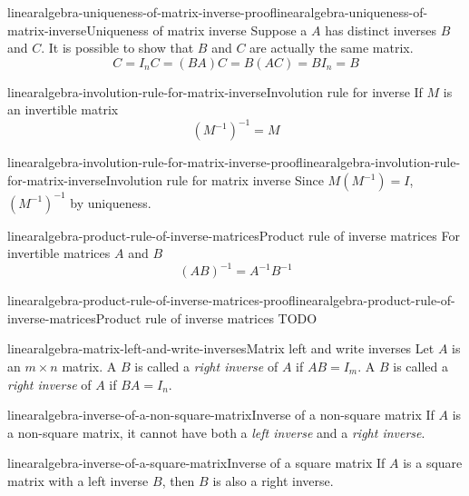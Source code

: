 \documentclass[preview]{standalone}
\begin{document}
\begin{snippetproof}{linearalgebra-uniqueness-of-matrix-inverse-proof}{linearalgebra-uniqueness-of-matrix-inverse}{Uniqueness of matrix inverse}
    Suppose a \matrix \(A\) has distinct inverses \(B\)
    and \(C\).
    It is possible to show that \(B\) and \(C\) are actually
    the same matrix.
    \[
        C=I_n C = (BA) C = B (AC) = BI_n = B
    \]
\end{snippetproof}

\begin{snippetproposition}{linearalgebra-involution-rule-for-matrix-inverse}{Involution rule for \matrix inverse}
    If \(M\) is an invertible matrix
    \[
        {(M^{-1})}^{-1} = M
    \]
\end{snippetproposition}

\begin{snippetproof}{linearalgebra-involution-rule-for-matrix-inverse-proof}{linearalgebra-involution-rule-for-matrix-inverse}{Involution rule for matrix inverse}
    Since \(M(M^{-1}) = I\), \({(M^{-1})}^{-1}\)
    by uniqueness. %
\end{snippetproof}

\begin{snippetproposition}{linearalgebra-product-rule-of-inverse-matrices}{Product rule of inverse matrices}
    For invertible matrices \(A\) and \(B\)
    \[
        {(AB)}^{-1} = A^{-1} B^{-1}
    \]
\end{snippetproposition}

\begin{snippetproof}{linearalgebra-product-rule-of-inverse-matrices-proof}{linearalgebra-product-rule-of-inverse-matrices}{Product rule of inverse matrices}
    TODO
\end{snippetproof}

\begin{snippetdefinition}{linearalgebra-matrix-left-and-write-inverses}{Matrix left and write inverses}
    Let \(A\) is an \(m \times n\) matrix. A \matrix \(B\)
    is called a \textit{right inverse} of \(A\)
    if \(AB=I_m\).
    A \matrix \(B\) is called a \textit{right inverse} of \(A\)
    if \(BA=I_n\).
\end{snippetdefinition}

\begin{snippetproposition}{linearalgebra-inverse-of-a-non-square-matrix}{Inverse of a non-square matrix}
    If \(A\) is a non-square matrix, it cannot have
    both a \textit{left inverse} and a \textit{right inverse}.
\end{snippetproposition}

\begin{snippetproposition}{linearalgebra-inverse-of-a-square-matrix}{Inverse of a square matrix}
    If \(A\) is a square matrix
    with a left inverse \(B\),
    then \(B\) is also a right inverse.
\end{snippetproposition}
\end{document}
